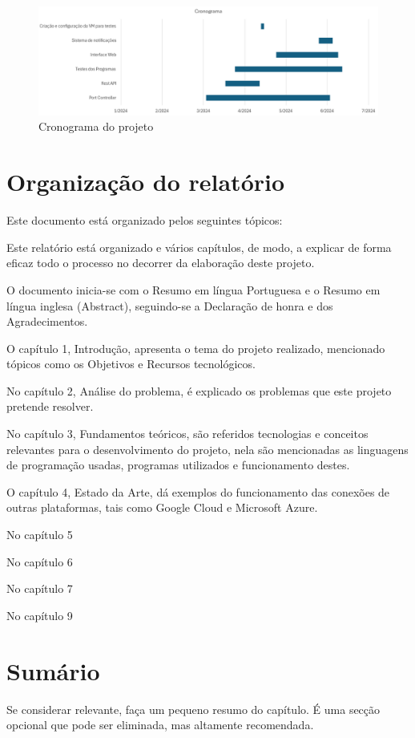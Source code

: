 \begin{figure}[H]
\begin{center}
\includegraphics[width=16cm]{figs/cronograma.png}
\caption{Cronograma do projeto}
\label{fig:bookstack}
\end{center}
\end{figure}


\section{Organização do relatório}
\label{sec:intro_struct}

Este documento está organizado pelos seguintes tópicos:

Este relatório está organizado e vários capítulos, de modo, a explicar de forma
eficaz todo o processo no decorrer da elaboração deste projeto.

O documento inicia-se com o Resumo em língua Portuguesa e o Resumo em língua 
inglesa (Abstract), seguindo-se a Declaração de honra e dos Agradecimentos.

O capítulo 1, Introdução, apresenta o tema do projeto realizado, mencionado tópicos
como os Objetivos e Recursos tecnológicos.

No capítulo 2, Análise do problema, é explicado os problemas que este projeto 
pretende resolver.

No capítulo 3, Fundamentos teóricos, são referidos tecnologias e conceitos relevantes 
para o desenvolvimento do projeto, nela são mencionadas as linguagens de programação usadas,
programas utilizados e funcionamento destes.

O capítulo 4, Estado da Arte, dá exemplos do funcionamento das conexões de outras 
plataformas, tais como Google Cloud e Microsoft Azure.

No capítulo 5

No capítulo 6

No capítulo 7

No capítulo 9




\section*{Sumário}
\label{sec:intro_summary}
Se considerar relevante, faça um pequeno resumo do capítulo. É uma secção opcional que pode ser eliminada, mas altamente recomendada.
\\
\\
\\
\\
